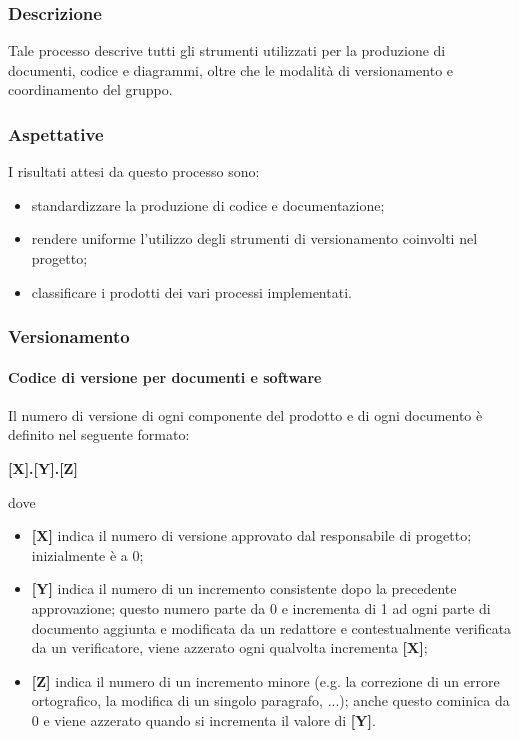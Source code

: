 \subsubsection{Descrizione}
Tale processo descrive tutti gli strumenti utilizzati per la produzione di documenti, codice e diagrammi,
oltre che le modalità di versionamento e coordinamento del gruppo.

\subsubsection{Aspettative}
I risultati attesi da questo processo sono:
\begin{itemize}
    \item standardizzare la produzione di codice e documentazione;
    \item rendere uniforme l'utilizzo degli strumenti di versionamento coinvolti nel progetto;
    \item classificare i prodotti dei vari processi implementati.
\end{itemize}

\subsubsection{Versionamento}
\paragraph{Codice di versione per documenti e software}
Il numero di versione di ogni componente del prodotto e di ogni documento è definito nel seguente formato:
\begin{center}
    \textbf{[X].[Y].[Z]}
\end{center}
dove
\begin{itemize}
    \item \textbf{[X]} indica il numero di versione approvato dal responsabile di progetto; inizialmente è a 0;
    \item \textbf{[Y]} indica il numero di un incremento consistente dopo la precedente approvazione; questo numero parte da
          0 e incrementa di 1 ad ogni parte di documento aggiunta e modificata da un redattore e contestualmente verificata da un verificatore,
          viene azzerato ogni qualvolta incrementa \textbf{[X]};
    \item \textbf{[Z]} indica il numero di un incremento minore (e.g. la correzione di un errore ortografico, la modifica di un singolo paragrafo, ...);
          anche questo cominica da 0 e viene azzerato quando si incrementa il valore di \textbf{[Y]}.
\end{itemize}

